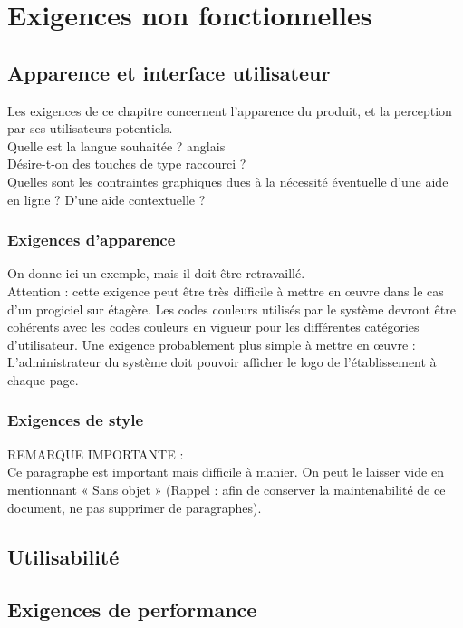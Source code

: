 	\section{Exigences non fonctionnelles}
		\subsection{Apparence et interface utilisateur}
		{\color{red}
		Les exigences de ce chapitre concernent l’apparence du produit, et la perception par ses utilisateurs potentiels. \\
		Quelle est la langue souhaitée ? anglais\\
		Désire-t-on des touches de type raccourci ?\\
		Quelles sont les contraintes graphiques dues à la nécessité éventuelle d’une aide en ligne ? D’une aide contextuelle ?
		}
			\subsubsection{Exigences d’apparence} 
			{\color{red}
			On donne ici un exemple, mais il doit être retravaillé.\\
			Attention : cette exigence peut être très difficile à mettre en œuvre dans le cas d’un progiciel sur étagère.
			Les codes couleurs utilisés par le système devront être cohérents avec les codes couleurs en vigueur pour les différentes catégories d’utilisateur.
			Une exigence probablement plus simple à mettre en œuvre :\\
			L’administrateur du système doit pouvoir afficher le logo de l’établissement à chaque page.
			}
			\subsubsection{Exigences de style}
			{\color{red}
			REMARQUE IMPORTANTE :\\
			Ce paragraphe est important mais difficile à manier. On peut le laisser vide en mentionnant « Sans objet » (Rappel : afin de conserver la maintenabilité de ce document, ne pas supprimer de paragraphes).
			}

		\subsection{Utilisabilité}
		
		\subsection{Exigences de performance}
		
